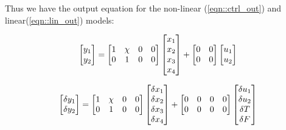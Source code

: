 Thus we have the output equation for the non-linear (\ref{eqn::ctrl_out}) and
linear(\ref{eqn::lin_out}) models:

\begin{equation}\label{eqn::ctrl_out}
    \begin{bmatrix} y_1 \\ y_2 \end{bmatrix} = \begin{bmatrix} 1 & \chi & 0 & 0 \\
                                 0 & 1       & 0 & 0 \end{bmatrix}
                            \begin{bmatrix} x_1 \\ x_2 \\ x_3 \\ x_4 \end{bmatrix} +
                            \begin{bmatrix} 0 & 0 \\
                                0 & 0 \\ \end{bmatrix}
                            \begin{bmatrix} u_1 \\ u_2 \end{bmatrix}
\end{equation}


\begin{equation}\label{eqn::lin_out}
    \begin{bmatrix} \delta y_1 \\ \delta y_2 \end{bmatrix} = \begin{bmatrix} 1 & \chi & 0 & 0 \\
                                 0 & 1       & 0 & 0 \end{bmatrix}
                            \begin{bmatrix} \delta x_1 \\ \delta x_2 \\ \delta x_3 \\ \delta x_4 \end{bmatrix} +
                            \begin{bmatrix} 0 & 0 & 0 & 0\\
                                0 & 0 & 0 & 0
                                 \end{bmatrix}
                            \begin{bmatrix} \delta u_1 \\ \delta u_2 \\ \delta T \\ \delta F \end{bmatrix}
\end{equation}
